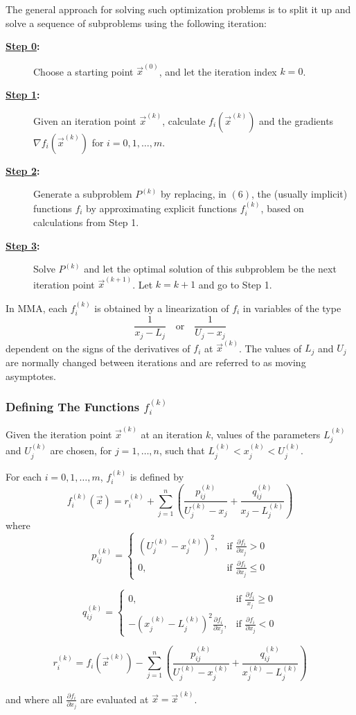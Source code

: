 The general approach for solving such optimization problems is to split it up and solve a sequence of subproblems using the following iteration:
{\color{baystate}
	\begin{description}
		\item[\textbf{\underline{Step 0}:}] Choose a starting point $\vec{x}^{(0)}$, and let the iteration index $k=0$.
		\item[\textbf{\underline{Step 1}:}] Given an iteration point $\vec{x}^{(k)}$, calculate $f_i(\vec{x}^{(k)})$ and the gradients $\nabla f_i(\vec{x}^{(k)})$ for $i=0,1,\ldots,m$.
		\item[\textbf{\underline{Step 2}:}] Generate a subproblem $P^{(k)}$ by replacing, in $(6)$, the (usually implicit) functions $f_i$ by approximating explicit functions $f_i^{(k)}$, based on calculations from Step 1.
		\item[\textbf{\underline{Step 3}:}] Solve $P^{(k)}$ and let the optimal solution of this subproblem be the next iteration point $\vec{x}^{(k+1)}$. Let $k=k+1$ and go to Step 1.
	\end{description}
}

In MMA, each $f_i^{(k)}$ is obtained by a linearization of $f_i$ in variables of the type $$\frac{1}{x_j-L_j}\quad\text{or}\quad\frac{1}{U_j-x_j}$$ dependent on the signs of the derivatives of $f_i$ at $\vec{x}^{(k)}$. The values of $L_j$ and $U_j$ are normally changed between iterations and are referred to as {\color{tiananmen}moving asymptotes}.

\subsubsection*{Defining The Functions $f_i^{(k)}$}

Given the iteration point $\vec{x}^{(k)}$ at an iteration $k$, values of the parameters $L_j^{(k)}$ and $U_j^{(k)}$ are chosen, for $j=1,\ldots,n$, such that $L_j^{(k)}<x_j^{(k)}<U_j^{(k)}$.

{\color{baystate}
	For each $i=0,1,\ldots,m$, $f_i^{(k)}$ is defined by $$f_i^{(k)}(\vec{x})=r_i^{(k)}+\sum\limits_{j=1}^{n}\left(\frac{p_{ij}^{(k)}}{U_j^{(k)}-x_j}+\frac{q_{ij}^{(k)}}{x_j-L_j^{(k)}}\right)$$
	where
	$$p_{ij}^{(k)}=\begin{cases}
		\left(U_j^{(k)}-x_j^{(k)}\right)^2, & \text{if }\frac{\partial f_i}{\partial x_j}>0\\
		0, & \text{if }\frac{\partial f_i}{\partial x_j}\leq 0
	\end{cases}$$
	
	$$q_{ij}^{(k)}=\begin{cases}
		0, & \text{if }\frac{\partial f_i}{x_j}\geq 0\\
		-\left(x_j^{(k)}-L_j^{(k)}\right)^2\frac{\partial f_i}{\partial x_j}, & \text{if }\frac{\partial f_i}{\partial x_j}<0
	\end{cases}$$
	
	$$r_i^{(k)}=f_i(\vec{x}^{(k)})-\sum\limits_{j=1}^{n}\left(\frac{p_{ij}^{(k)}}{U_j^{(k)}-x_j^{(k)}}+\frac{q_{ij}^{(k)}}{x_j^{(k)}-L_j^{(k)}}\right)$$
	
	and where all $\frac{\partial f_i}{\partial x_j}$ are evaluated at $\vec{x}=\vec{x}^{(k)}$.
}

